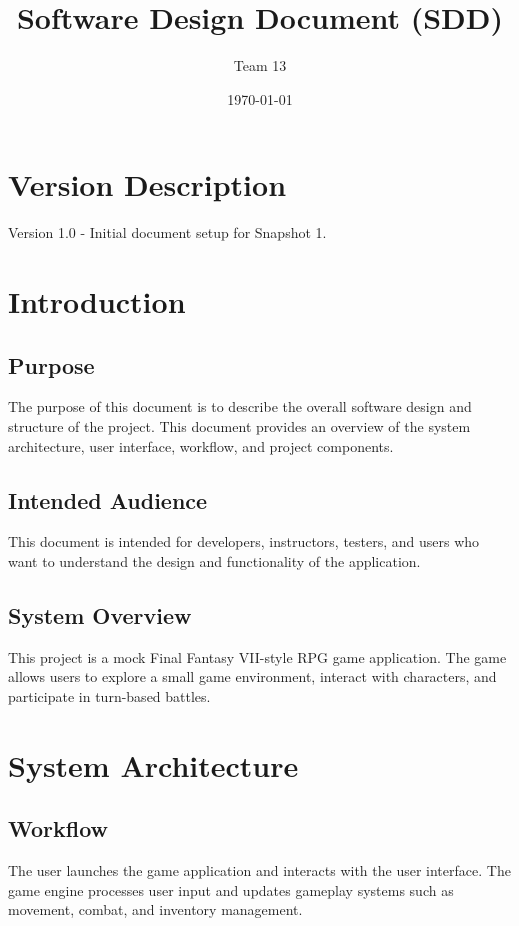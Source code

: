 \documentclass{article}
\begin{document}
\title{Software Design Document (SDD)}
\author{Team 13}
\date{\today}
\maketitle

\newpage

\tableofcontents

\newpage

\section{Version Description}
Version 1.0 - Initial document setup for Snapshot 1.

\section{Introduction}

\subsection{Purpose}
The purpose of this document is to describe the overall software design and structure of the project. This document provides an overview of the system architecture, user interface, workflow, and project components.

\subsection{Intended Audience}
This document is intended for developers, instructors, testers, and users who want to understand the design and functionality of the application.

\subsection{System Overview}
This project is a mock Final Fantasy VII-style RPG game application. The game allows users to explore a small game environment, interact with characters, and participate in turn-based battles.

\section{System Architecture}

\subsection{Workflow}
The user launches the game application and interacts with the user interface. The game engine processes user input and updates gameplay systems such as movement, combat, and inventory management.
\end{document}
